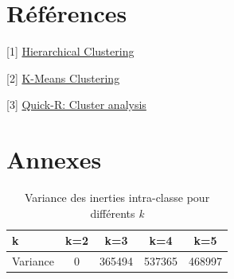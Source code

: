 \documentclass{article}
\begin{document}
\section*{Références}
[1] \href{https://stat.ethz.ch/R-manual/R-devel/library/stats/html/hclust.html}{Hierarchical Clustering}

[2] \href{https://stat.ethz.ch/R-manual/R-devel/library/stats/html/kmeans.html}{K-Means Clustering}

[3] \href{http://www.statmethods.net/advstats/cluster.html}{Quick-R: Cluster analysis}



\section*{Annexes}

\begin{table}[H]
\caption{Variance des inerties intra-classe pour différents \textit{k}}\label{tab3.3.2_var}
\centering
\begin{tabular}{l|cccc}
k & k=2 & k=3 & k=4 & k=5 \\
\hline
Variance & 0 & 365494 &537365 &468997
\end{tabular}
\end{table}




\end{document}
